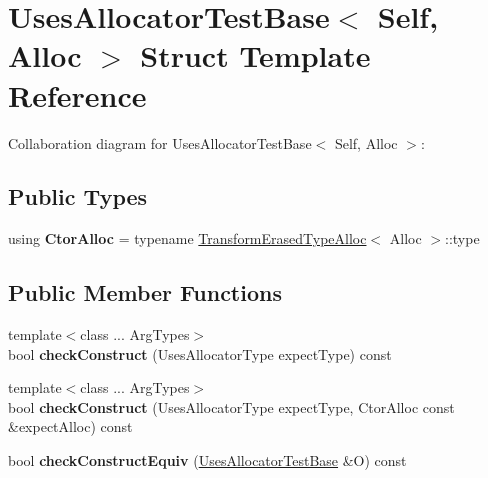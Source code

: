 \hypertarget{struct_uses_allocator_test_base}{}\section{Uses\+Allocator\+Test\+Base$<$ Self, Alloc $>$ Struct Template Reference}
\label{struct_uses_allocator_test_base}


Collaboration diagram for Uses\+Allocator\+Test\+Base$<$ Self, Alloc $>$\+:
\subsection*{Public Types}
\begin{DoxyCompactItemize}
\item 
\mbox{\label{struct_uses_allocator_test_base_abb98a14ba93cdd2a21f315af01bc3359}} 
using {\bfseries Ctor\+Alloc} = typename \mbox{\hyperlink{struct_transform_erased_type_alloc}{Transform\+Erased\+Type\+Alloc}}$<$ Alloc $>$\+::type
\end{DoxyCompactItemize}
\subsection*{Public Member Functions}
\begin{DoxyCompactItemize}
\item 
\mbox{\label{struct_uses_allocator_test_base_ae187b413560c5cbaf9e466b11b1cf68b}} 
{\footnotesize template$<$class ... Arg\+Types$>$ }\\bool {\bfseries check\+Construct} (Uses\+Allocator\+Type expect\+Type) const
\item 
\mbox{\label{struct_uses_allocator_test_base_aaebf15ee0af4105eb971dbde44519065}} 
{\footnotesize template$<$class ... Arg\+Types$>$ }\\bool {\bfseries check\+Construct} (Uses\+Allocator\+Type expect\+Type, Ctor\+Alloc const \&expect\+Alloc) const
\item 
\mbox{\label{struct_uses_allocator_test_base_a428feaa144a7df4e4cffbfd26d42a8dd}} 
bool {\bfseries check\+Construct\+Equiv} (\mbox{\hyperlink{struct_uses_allocator_test_base}{Uses\+Allocator\+Test\+Base}} \&O) const
\end{DoxyCompactItemize}
